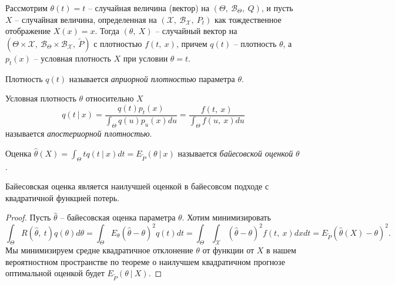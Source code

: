 Рассмотрим $\displaystyle \theta ( t) =t$ -- случайная величина (вектор) на $\displaystyle ( \Theta ,\ \mathcal{B}_{\Theta } ,\ Q)$, и пусть $\displaystyle X$ -- случайная величина, определенная на $\displaystyle (\mathcal{X} ,\ \mathcal{B}_{\mathcal{X}} ,\ P_{t})$ как тождественное отображение $\displaystyle X( x) =x$. Тогда $\displaystyle ( \theta ,\ X)$ -- случайный вектор на $\displaystyle \left( \Theta \times \mathcal{X} ,\ \mathcal{B}_{\Theta } \times \mathcal{B}_{\mathcal{X}} ,\ \tilde{P}\right)$ с плотностью $\displaystyle f( t,\ x)$, причем $\displaystyle q( t)$ -- плотность $\displaystyle \theta $, а $\displaystyle p_{t}( x)$ -- условная плотность $\displaystyle X$ при условии $\displaystyle \theta =t$.
\begin{definition}
    Плотность $\displaystyle q( t)$ называется \textit{априорной плотностью} параметра $\displaystyle \theta $.
\end{definition}
\begin{definition}
    Условная плотность $\displaystyle \theta $ относительно $\displaystyle X$
    \begin{equation*}
        q( t\ |\ x) =\dfrac{q( t) p_{t}( x)}{\int _{\Theta } q( u) p_{u}( x) du} =\dfrac{f( t,\ x)}{\int _{\Theta } f( u,\ x) du}
    \end{equation*}
    называется \textit{апостериорной плотностью}.
\end{definition}
\begin{definition}
    Оценка $\displaystyle \hat{\theta }( X) =\int _{\Theta } tq( t\ |\ x) dt=E_{\tilde{P}}( \theta \ |\ x)$ называется \textit{байесовской оценкой} $\displaystyle \theta $.
\end{definition}
\begin{theorem}
    Байесовская оценка является наилучшей оценкой в байесовсом подходе с квадратичной функцией потерь.
\end{theorem}
\begin{proof}
    Пусть $\displaystyle \hat{\theta }$ -- байесовская оценка параметра $\displaystyle \theta $. Хотим минимизировать
    \begin{equation*}
        \int _{\Theta } R(\hat{\theta } ,\ t) q( \theta ) d\theta =\int _{\Theta } E_{\theta }(\hat{\theta } -\theta )^{2} q( t) dt=\int _{\Theta }\int _{\mathcal{X}}(\hat{\theta } -\theta )^{2} f( t,\ x) dxdt=E_{\tilde{P}}(\hat{\theta }( X) -\theta )^{2} .
    \end{equation*}
    Мы минимизируем средне квадратичное отклонение $\displaystyle \theta $ от функции от $\displaystyle X$ в нашем вероятностном пространстве по теореме о наилучшем квадратичном прогнозе оптимальной оценкой будет $\displaystyle E_{\tilde{P}}( \theta \ |\ X)$.
\end{proof}
